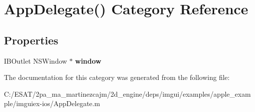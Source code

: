 \hypertarget{category_app_delegate_07_08}{}\section{App\+Delegate() Category Reference}
\label{category_app_delegate_07_08}
\subsection*{Properties}
\begin{DoxyCompactItemize}
\item 
\mbox{\label{category_app_delegate_07_08_ab23aa75c68dacbf295bd62577cfbef88}} 
I\+B\+Outlet N\+S\+Window $\ast$ {\bfseries window}
\end{DoxyCompactItemize}


The documentation for this category was generated from the following file\+:\begin{DoxyCompactItemize}
\item 
C\+:/\+E\+S\+A\+T/2pa\+\_\+ma\+\_\+martinezcajm/2d\+\_\+engine/deps/imgui/examples/apple\+\_\+example/imguiex-\/ios/App\+Delegate.\+m\end{DoxyCompactItemize}
